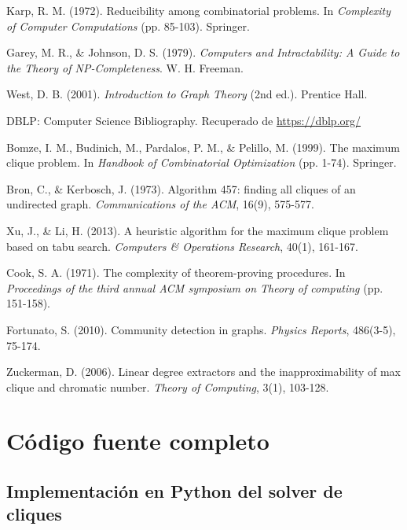 \documentclass[12pt,a4paper]{report}
\begin{document}
\begin{thebibliography}{99}

Karp, R. M. (1972). Reducibility among combinatorial problems. In \textit{Complexity of Computer Computations} (pp. 85-103). Springer.

Garey, M. R., \& Johnson, D. S. (1979). \textit{Computers and Intractability: A Guide to the Theory of NP-Completeness}. W. H. Freeman.

West, D. B. (2001). \textit{Introduction to Graph Theory} (2nd ed.). Prentice Hall.

DBLP: Computer Science Bibliography. Recuperado de \url{https://dblp.org/}

Bomze, I. M., Budinich, M., Pardalos, P. M., \& Pelillo, M. (1999). The maximum clique problem. In \textit{Handbook of Combinatorial Optimization} (pp. 1-74). Springer.

Bron, C., \& Kerbosch, J. (1973). Algorithm 457: finding all cliques of an undirected graph. \textit{Communications of the ACM}, 16(9), 575-577.

Xu, J., \& Li, H. (2013). A heuristic algorithm for the maximum clique problem based on tabu search. \textit{Computers \& Operations Research}, 40(1), 161-167.

Cook, S. A. (1971). The complexity of theorem-proving procedures. In \textit{Proceedings of the third annual ACM symposium on Theory of computing} (pp. 151-158).

Fortunato, S. (2010). Community detection in graphs. \textit{Physics Reports}, 486(3-5), 75-174.

Zuckerman, D. (2006). Linear degree extractors and the inapproximability of max clique and chromatic number. \textit{Theory of Computing}, 3(1), 103-128.

\end{thebibliography}

\newpage

\appendix
\chapter{Código fuente completo}

\section{Implementación en Python del solver de cliques}
\end{document}
